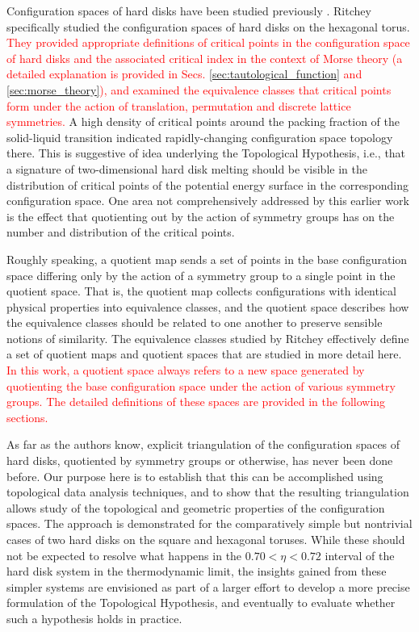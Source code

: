 \documentclass[default,iicol]{sn-jnl}%
\theoremstyle{thmstyleone}%
\theoremstyle{thmstyletwo}%
\theoremstyle{thmstylethree}%
\providecommand{\red}[1]{\textcolor{red}{#1}}
\begin{document}
Configuration spaces of hard disks have been studied previously \cite{carlsson2012harddisks,baryshnikov2014min}. Ritchey \cite{ritcheyphd} specifically studied the configuration spaces of hard disks on the hexagonal torus. \red{They provided appropriate definitions of critical points in the configuration space of hard disks and the associated critical index in the context of Morse theory (a detailed explanation is provided in Secs. \ref{sec:tautological_function} and \ref{sec:morse_theory}), and examined the equivalence classes that critical points form under the action of translation, permutation and discrete lattice symmetries.} A high density of critical points around the packing fraction of the solid-liquid transition indicated rapidly-changing configuration space topology there. This is suggestive of idea underlying the Topological Hypothesis, i.e., that a signature of two-dimensional hard disk melting should be visible in the distribution of critical points of the potential energy surface in the corresponding configuration space. One area not comprehensively addressed by this earlier work is the effect that quotienting out by the action of symmetry groups has on the number and distribution of the critical points.

Roughly speaking, a quotient map sends a set of points in the base configuration space differing only by the action of a symmetry group to a single point in the quotient space. That is, the quotient map collects configurations with identical physical properties into equivalence classes, and the quotient space describes how the equivalence classes should be related to one another to preserve sensible notions of similarity. The equivalence classes studied by Ritchey \cite{ritcheyphd} effectively define a set of quotient maps and quotient spaces that are studied in more detail here. \red{In this work, a quotient space always refers to a new space generated by quotienting the base configuration space under the action of various symmetry groups. The detailed definitions of these spaces are provided in the following sections.}

As far as the authors know, explicit triangulation of the configuration spaces of hard disks, quotiented by symmetry groups or otherwise, has never been done before. Our purpose here is to establish that this can be accomplished using topological data analysis techniques, and to show that the resulting triangulation allows study of the topological and geometric properties of the configuration spaces. The approach is demonstrated for the comparatively simple but nontrivial cases of two hard disks on the square and hexagonal toruses. While these should not be expected to resolve what happens in the $0.70 < \eta < 0.72$ interval of the hard disk system in the thermodynamic limit, the insights gained from these simpler systems are envisioned as part of a larger effort to develop a more precise formulation of the Topological Hypothesis, and eventually to evaluate whether such a hypothesis holds in practice.
\end{document}
